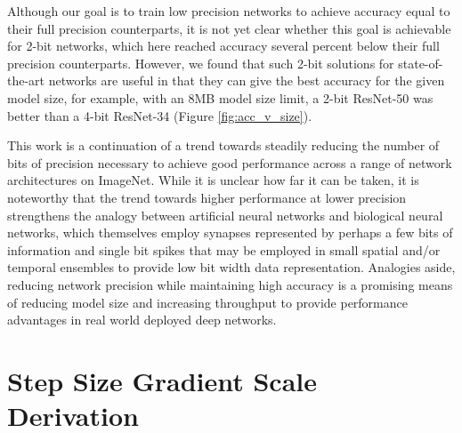\documentclass{article}
\begin{document}
Although our goal is to train low precision networks to achieve accuracy equal to their full precision counterparts, it is not yet clear whether this goal is achievable for 2-bit networks, which here reached accuracy several percent below their full precision counterparts.  However, we found that such 2-bit solutions for state-of-the-art networks are useful in that they can give the best accuracy for the given model size, for example, with an 8MB model size limit, a 2-bit ResNet-50 was better than a 4-bit ResNet-34 (Figure \ref{fig:acc_v_size}).

This work is a continuation of a trend towards steadily reducing the number of bits of precision necessary to achieve good performance across a range of network architectures on ImageNet.
%
While it is unclear how far it can be taken, it is noteworthy that the trend towards higher performance at lower precision strengthens the analogy between artificial neural networks and biological neural networks, which themselves employ synapses represented by perhaps a few bits of information \citep{bartol2015nanoconnectomic} and single bit spikes that may be employed in small spatial and/or temporal ensembles to provide low bit width data representation.
%
Analogies aside, reducing network precision while maintaining high accuracy is a promising means of reducing model size and increasing throughput to provide performance advantages in real world deployed deep networks.




\FloatBarrier





\FloatBarrier


\appendix

\section{Step Size Gradient Scale Derivation}
\label{a:gradscale}
\end{document}

